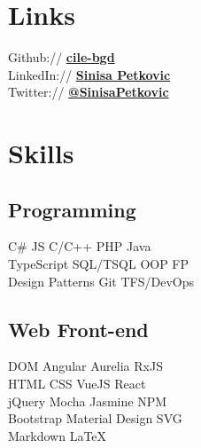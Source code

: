 \documentclass[letterpaper]{deedy-resume} %
\begin{document}
\begin{minipage}[t]{0.33\textwidth} %


\section{Links} 

Github:// \href{https://github.com/cile-bgd}{\bf cile-bgd} \\
LinkedIn:// \href{https://www.linkedin.com/in/sinisa-petkovic-b704034/}{\bf Sinisa Petkovic} \\
Twitter:// \href{https://twitter.com/SinisaPetkovic}{\bf @SinisaPetkovic} \\



\section{Skills}

\subsection{Programming}

C\# \textbullet{} JS \textbullet{} C/C++ \textbullet{} PHP \textbullet{} Java\\
TypeScript \textbullet{} SQL/TSQL \textbullet{} OOP \textbullet{} FP\\
Design Patterns \textbullet{} Git \textbullet{} TFS/DevOps

\sectionspace %

\subsection{Web Front-end}

DOM \textbullet{} Angular \textbullet{} Aurelia \textbullet{} RxJS\\
HTML \textbullet{} CSS \textbullet{} VueJS \textbullet{} React\\
jQuery \textbullet{} Mocha \textbullet{} Jasmine \textbullet{} NPM\\
Bootstrap \textbullet{} Material Design \textbullet{} SVG\\
Markdown \textbullet{} \LaTeX\


\end{minipage}
\end{document}
